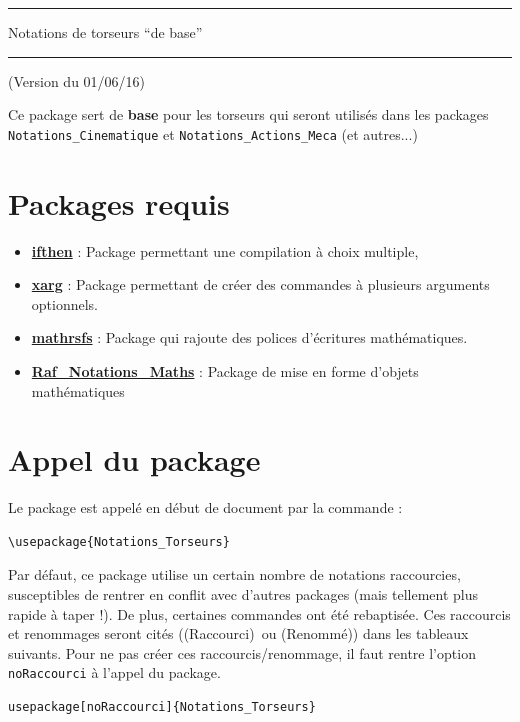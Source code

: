 \documentclass[a4paper,10pt]{article}
\newcommand{\rac}{({\color{red}Raccourci})}
\newcommand{\ren}{({\color{blue}Renommé})}
\begin{document}
	\begin{center}
		\hrule{\Large Notations de torseurs ``de base''}\\\hrule
	\end{center}

	(Version du 01/06/16)

	Ce package sert de \textbf{base} pour les torseurs qui seront utilisés dans les packages \verb!Notations_Cinematique! et \verb!Notations_Actions_Meca! (et autres...)

	\section{Packages requis}

	\begin{itemize}
		\item \href{http://www.ctan.org/pkg/ifthen}{\textbf{ifthen}} : Package permettant une compilation à choix multiple,
		\item \href{http://tug.ctan.org/tex-archive/macros/latex/contrib/xargs}{\textbf{xarg}} : Package permettant de créer des commandes à plusieurs arguments optionnels.
		\item \href{http://www.ctan.org/pkg/mathrsfs}{\textbf{mathrsfs}} : Package qui rajoute des polices d'écritures mathématiques.
		\item \href{http://enseignement.allais.eu/page-latex}{\textbf{Raf\_Notations\_Maths}} : Package de mise en forme d'objets mathématiques
	\end{itemize}

	\section{Appel du package}
	Le package est appelé en début de document par la commande :
	\begin{verbatim}
\usepackage{Notations_Torseurs}
	\end{verbatim}

	Par défaut, ce package utilise un certain nombre de notations raccourcies, susceptibles de rentrer en conflit avec d'autres packages (mais tellement plus rapide à taper !).
	De plus, certaines commandes ont été rebaptisée.
	Ces raccourcis et renommages seront cités (\rac\ ou \ren) dans les tableaux suivants.
	Pour ne pas créer ces raccourcis/renommage, il faut rentre l'option \verb!noRaccourci! à l'appel du package.

	\begin{verbatim}
usepackage[noRaccourci]{Notations_Torseurs}
	\end{verbatim}
\end{document}
